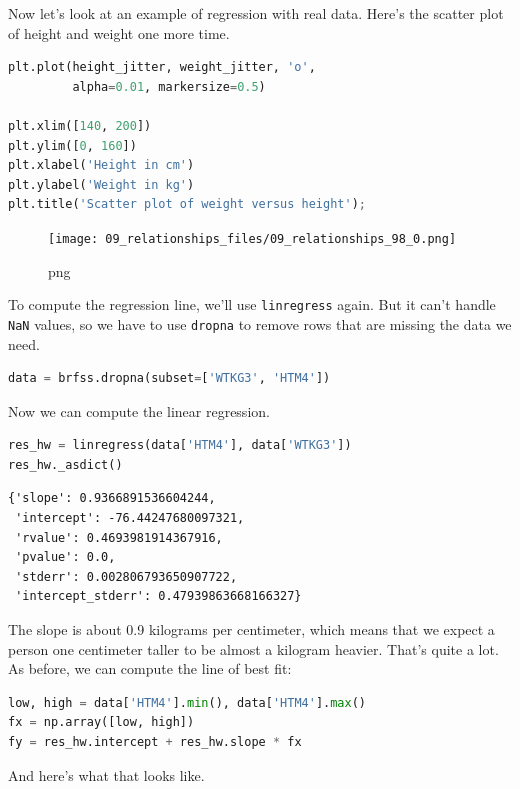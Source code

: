 \documentclass[
]{book}
\newcommand{\passthrough}[1]{#1}
\begin{document}
Now let's look at an example of regression with real data. Here's the
scatter plot of height and weight one more time.

\begin{lstlisting}[language=Python]
plt.plot(height_jitter, weight_jitter, 'o', 
         alpha=0.01, markersize=0.5)

plt.xlim([140, 200])
plt.ylim([0, 160])
plt.xlabel('Height in cm')
plt.ylabel('Weight in kg')
plt.title('Scatter plot of weight versus height');
\end{lstlisting}

\begin{figure}
\centering
\texttt{[image: 09\_relationships\_files/09\_relationships\_98\_0.png]}
\caption{png}
\end{figure}

To compute the regression line, we'll use
\passthrough{\lstinline!linregress!} again. But it can't handle
\passthrough{\lstinline!NaN!} values, so we have to use
\passthrough{\lstinline!dropna!} to remove rows that are missing the
data we need.

\begin{lstlisting}[language=Python]
data = brfss.dropna(subset=['WTKG3', 'HTM4'])
\end{lstlisting}

Now we can compute the linear regression.

\begin{lstlisting}[language=Python]
res_hw = linregress(data['HTM4'], data['WTKG3'])
res_hw._asdict()
\end{lstlisting}

\begin{lstlisting}
{'slope': 0.9366891536604244,
 'intercept': -76.44247680097321,
 'rvalue': 0.4693981914367916,
 'pvalue': 0.0,
 'stderr': 0.002806793650907722,
 'intercept_stderr': 0.47939863668166327}
\end{lstlisting}

The slope is about 0.9 kilograms per centimeter, which means that we
expect a person one centimeter taller to be almost a kilogram heavier.
That's quite a lot. As before, we can compute the line of best fit:

\begin{lstlisting}[language=Python]
low, high = data['HTM4'].min(), data['HTM4'].max()
fx = np.array([low, high])
fy = res_hw.intercept + res_hw.slope * fx
\end{lstlisting}

And here's what that looks like.
\end{document}
